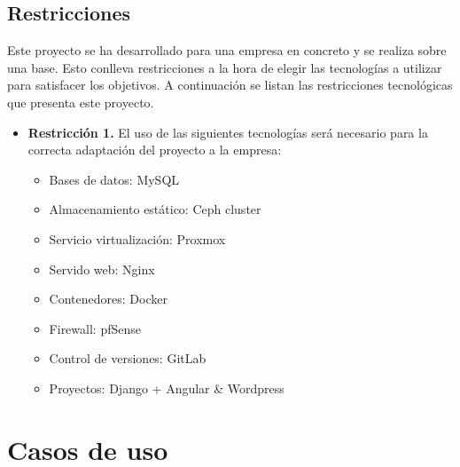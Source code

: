 	\subsection{Restricciones}
	\label{restricciones}
	\begin{text}
		Este proyecto se ha desarrollado para una empresa en concreto y se realiza sobre una base. Esto conlleva restricciones a la hora de elegir las tecnologías a utilizar para satisfacer los objetivos. A continuación se listan las restricciones tecnológicas que presenta este proyecto.
		
		\begin{itemize}
			\item \textbf{Restricción 1.} El uso de las siguientes tecnologías será necesario para la correcta adaptación del proyecto a la empresa:
			\begin{itemize}
				\item Bases de datos: MySQL
				\item Almacenamiento estático: Ceph cluster
				\item Servicio virtualización: Proxmox
				\item Servido web: Nginx
				\item Contenedores: Docker
				\item Firewall: pfSense
				\item Control de versiones: GitLab
				\item Proyectos: Django + Angular \& Wordpress
			\end{itemize}
		\end{itemize}
	\end{text}

\clearpage
\section{Casos de uso}
